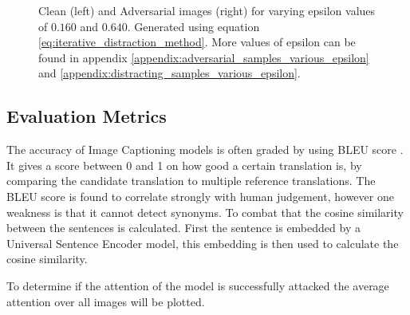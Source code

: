 \begin{figure}[h]
    \centering
    \vspace{\floatsep}
    \vspace{\floatsep}
    \vspace{\floatsep}
    \caption{Clean (left) and Adversarial images (right) for varying epsilon values of $0.160$ and $0.640$. Generated using equation \ref{eq:iterative_distraction_method}. More values of epsilon can be found in appendix \ref{appendix:adversarial_samples_various_epsilon} and \ref{appendix:distracting_samples_various_epsilon}.}
    \label{fig:distract_noise_examples}
\end{figure}

\subsection{Evaluation Metrics}
The accuracy of Image Captioning models is often graded by using BLEU score \cite{papineni_roukos_ward_zhu_2001}. It gives a score between 0 and 1 on how good a certain translation is, by comparing the candidate translation to multiple reference translations. The BLEU score is found to correlate strongly with human judgement, however one weakness is that it cannot detect synonyms. To combat that the cosine similarity between the sentences is calculated. First the sentence is embedded by a Universal Sentence Encoder\cite{DBLP:journals/corr/abs-1803-11175} model, this embedding is then used to calculate the cosine similarity.

To determine if the attention of the model is successfully attacked the average attention over all images will be plotted.